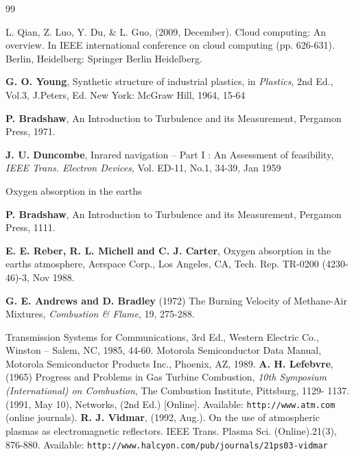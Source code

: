 \newpage
\renewcommand{\bibname}{References}
\begin{thebibliography}{99}

\cite{a1}
L. Qian, Z. Luo, Y. Du, \& L. Guo, (2009, December). Cloud computing: An overview. In IEEE international conference on cloud computing (pp. 626-631). Berlin, Heidelberg: Springer Berlin Heidelberg.

{\bfseries G. O. Young}, Synthetic structure of industrial plastics, in {\em Plastics}, 2nd Ed., Vol.3,
J.Peters, Ed. New York: McGraw Hill, 1964, 15-64

{\bfseries P. Bradshaw},  An Introduction to Turbulence and its Measurement, Pergamon Press,
1971.

{\bfseries J. U. Duncombe}, Inrared navigation – Part I : An Assessment of feasibility, {\em IEEE
Trans. Electron Devices}, Vol. ED-11, No.1, 34-39, Jan 1959

Oxygen absorption in the earths

{\bfseries P. Bradshaw},  An Introduction to Turbulence and its Measurement, Pergamon Press,
1111.

{\bfseries E. E. Reber, R. L. Michell and C. J. Carter}, Oxygen absorption in the earths
atmosphere, Aerspace Corp., Los Angeles, CA, Tech. Rep. TR-0200 (4230-46)-3, Nov
1988.

{\bfseries G. E. Andrews and D. Bradley} (1972) The Burning Velocity of Methane-Air Mixtures,
{\em Combustion \& Flame}, 19, 275-288.

Transmission Systems for Communications, 3rd Ed., Western Electric Co., Winston –
Salem, NC, 1985, 44-60.
Motorola Semiconductor Data Manual, Motorola Semiconductor Products Inc.,
Phoenix, AZ, 1989.
{\bfseries A. H. Lefebvre}, (1965) Progress and Problems in Gas Turbine Combustion, {\em 10th
Symposium (International) on Combustion}, The Combustion Institute, Pittsburg, 1129-
1137.
 (1991, May 10), Networks, (2nd Ed.) [Online]. Available: {\tt http://www.atm.com} (online journals).
{\bfseries R. J. Vidmar}, (1992, Aug.). On the use of atmospheric plasmas as electromagnetic
reflectors. IEEE Trans. Plasma Sci. (Online).21(3), 876-880. Available:
{\tt http://www.halcyon.com/pub/journals/21ps03-vidmar}
\end{thebibliography}
